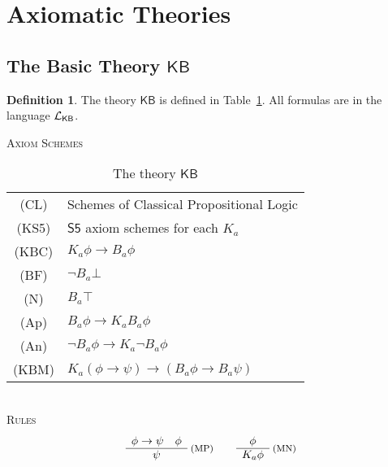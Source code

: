 \documentclass[12pt]{article}
\theoremstyle{definition}
\newtheorem{definition}[theorem]{Definition}
\newcommand{\Lang}{{\cal L}}   %
\newcommand{\KB}{{\mathsf{KB}}}                        %
\begin{document}
\section{Axiomatic Theories}

\subsection{The Basic Theory \texorpdfstring{$\KB$}{KB}}

\begin{definition}
  The theory $\KB$ is defined in Table~\ref{table:KB}.  All
  formulas are in the language $\Lang_\KB$.
\end{definition}

\begin{table}[ht]
  \begin{center}
    \textsc{Axiom Schemes}\\[.4em]
    \renewcommand{\arraystretch}{1.3}
    \begin{tabular}[t]{cl}
      (CL) &
      Schemes of Classical Propositional Logic
      \\
      (KS5) &
      $\mathsf{S5}$ axiom schemes for each $K_a$
      \\
      (KBC) &
      $K_a\phi\to B_a\phi$
      \\
      (BF) &
      $\lnot B_a\bot$
      \\
      (N) &
      $B_a\top$
      \\
      (Ap) &
      $B_a\phi\to K_aB_a\phi$
      \\
      (An) &
      $\lnot B_a\phi\to K_a\lnot B_a\phi$
      \\
      (KBM) &
      $K_a(\phi\to\psi)\to(B_a\phi\to B_a\psi)$
    \end{tabular}
    \renewcommand{\arraystretch}{1.0}
    \\[1em]
    \textsc{Rules}\vspace{-.5em}
    \[
    \begin{array}{c}
      \phi\to\psi \quad \phi
      \\\hline
      \psi
    \end{array}\;\text{\footnotesize(MP)}
    \qquad
    \begin{array}{c}
      \phi
      \\\hline
      K_a\phi
    \end{array}\;\text{\footnotesize(MN)}
    \]
  \end{center}
  \caption{The theory $\KB$}
  \label{table:KB}
\end{table}
\end{document}
